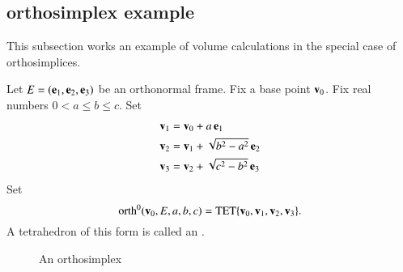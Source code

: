 %
%
%
%
%



\subsection{orthosimplex example}
%

This subsection works an example of volume calculations in the special
case of orthosimplices.

\begin{definition}[orthosimplex]\label{def:orth}  Let
$E=({\mathbf e}_1,{\mathbf e}_2,{\mathbf e}_3)$ be an orthonormal frame.  Fix a base point ${\mathbf v}_0$.
Fix real numbers  $0<a\le b \le c$.  Set
\begin{align*}
{\mathbf v}_1 &= {\mathbf v}_0 + a \,{\mathbf e}_1\\
{\mathbf v}_2 &= {\mathbf v}_1 + \sqrt{b^2-a^2}\, {\mathbf e}_2\\
{\mathbf v}_3 &= {\mathbf v}_2 + \sqrt{c^2-b^2} \,{\mathbf e}_3
\end{align*}
Set 
\[ {\operatorname{orth}}^0({\mathbf v}_0,E,a,b,c)={\operatorname{TET}}\{{\mathbf v}_0,{\mathbf v}_1,{\mathbf v}_2,{\mathbf v}_3\}.\]
A tetrahedron of this form is called an .
\end{definition}

\begin{figure}[htb]
\centering
\caption{An orthosimplex}
\label{fig:rogers}
\end{figure}

